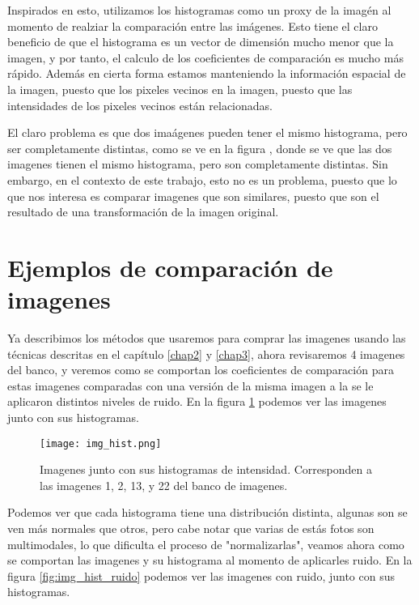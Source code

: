Inspirados en esto, utilizamos los histogramas como un proxy de la imag\'en al momento de realziar la comparaci\'on entre las im\'agenes. Esto tiene el claro beneficio de que el histograma es un vector de dimensi\'on mucho menor que la imagen, y por tanto, el calculo de los coeficientes de comparaci\'on es mucho m\'as r\'apido. Adem\'as en cierta forma estamos manteniendo la informaci\'on espacial de la imagen, puesto que los pixeles vecinos en la imagen, puesto que las intensidades de los pixeles vecinos est\'an relacionadas. 

El claro problema es que dos ima\'agenes pueden tener el mismo histograma, pero ser completamente distintas, como se ve en la figura , donde se ve que las dos imagenes tienen el mismo histograma, pero son completamente distintas. Sin embargo, en el contexto de este trabajo, esto no es un problema, puesto que lo que nos interesa es comparar imagenes que son similares, puesto que son el resultado de una transformaci\'on de la imagen original.

\section{Ejemplos de comparaci\'on de imagenes}

Ya describimos los m\'etodos que usaremos para comprar las imagenes usando las t\'ecnicas descritas en el cap\'itulo \ref{chap2} y \ref{chap3}, ahora revisaremos 4 imagenes del banco, y veremos como se comportan los coeficientes de comparaci\'on para estas imagenes comparadas con una versi\'on de la misma imagen a la se le aplicaron distintos niveles de ruido. En la figura \ref{fig:img_hist} podemos ver las imagenes junto con sus histogramas.

\begin{figure}[H]
    \centering
    \texttt{[image: img\_hist.png]}
    \caption{Imagenes junto con sus histogramas de intensidad. Corresponden a las imagenes 1, 2, 13, y 22 del banco de imagenes.}
    \label{fig:img_hist}
\end{figure}

Podemos ver que cada histograma tiene una distribuci\'on distinta, algunas son se ven m\'as normales que otros, pero cabe notar que varias de est\'as fotos son multimodales, lo que dificulta el proceso de "normalizarlas", veamos ahora como se comportan las imagenes y su histograma al momento de aplicarles ruido. En la figura \ref{fig:img_hist_ruido} podemos ver las imagenes con ruido, junto con sus histogramas.

